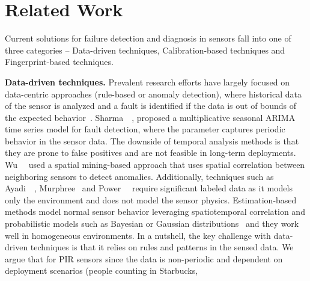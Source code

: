 \section{Related Work} 
\label{sec:related}







Current solutions for failure detection and diagnosis in sensors fall into one of three categories -- \ca Data-driven techniques, \cb Calibration-based techniques and \cc Fingerprint-based techniques.

\textbf{Data-driven techniques.} Prevalent research efforts have largely focused on data-centric approaches (rule-based or anomaly detection), where historical data %
of the sensor is analyzed and a fault is identified if the data is out of bounds of the expected behavior~\cite{rashid2016collect, 10.1145/3365871.3365872}.  Sharma~\etal~\cite{10.1145/1754414.1754419}, proposed a multiplicative seasonal ARIMA time series model for fault detection, where the parameter captures periodic behavior in the sensor data. %
The downside of temporal analysis methods is that
they are prone to false positives and are not feasible in long-term
deployments. Wu~\etal~\cite{4262542} used a spatial mining-based approach that uses spatial correlation between neighboring sensors to detect anomalies. Additionally, techniques such as Ayadi~\etal~\cite{7505190}, Murphree~\cite{7589589} and Power~\etal~\cite{10.1145/3365871.3365872} require significant labeled data as it models only the environment and does not model the sensor physics. Estimation-based methods model normal sensor behavior leveraging spatiotemporal correlation and probabilistic models such as Bayesian or Gaussian distributions~\cite{10.1145/1140104.1140114} and they work well in homogeneous environments. In a nutshell, the key challenge with data-driven techniques is that it relies on rules and patterns in the sensed data.
We argue that for PIR sensors since the data is non-periodic and dependent on deployment scenarios (\eg people counting in Starbucks,   
